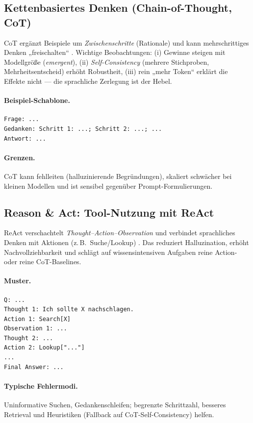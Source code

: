 \subsection{Kettenbasiertes Denken (Chain-of-Thought, CoT)}
CoT ergänzt Beispiele um \emph{Zwischenschritte} (Rationale) und kann mehrschrittiges Denken „freischalten“ \cite{wei2022chain}. 
Wichtige Beobachtungen: (i) Gewinne steigen mit Modellgröße (\emph{emergent}), (ii) \emph{Self-Consistency} (mehrere Stichproben, Mehrheitsentscheid) erhöht Robustheit, (iii) rein „mehr Token“ erklärt die Effekte nicht — die sprachliche Zerlegung ist der Hebel.

\paragraph{Beispiel-Schablone.}
\begin{verbatim}
Frage: ...
Gedanken: Schritt 1: ...; Schritt 2: ...; ...
Antwort: ...
\end{verbatim}

\paragraph{Grenzen.} CoT kann fehlleiten (halluzinierende Begründungen), skaliert schwächer bei kleinen Modellen und ist sensibel gegenüber Prompt-Formulierungen.

\subsection{Reason \& Act: Tool-Nutzung mit ReAct}
ReAct verschachtelt \emph{Thought–Action–Observation} und verbindet sprachliches Denken mit Aktionen (z.\,B.\ Suche/Lookup) \cite{yao2023react}. 
Das reduziert Halluzination, erhöht Nachvollziehbarkeit und schlägt auf wissensintensiven Aufgaben reine Action- oder reine CoT-Baselines.

\paragraph{Muster.}
\begin{verbatim}
Q: ...
Thought 1: Ich sollte X nachschlagen.
Action 1: Search[X]
Observation 1: ...
Thought 2: ...
Action 2: Lookup["..."]
...
Final Answer: ...
\end{verbatim}

\paragraph{Typische Fehlermodi.} Uninformative Suchen, Gedankenschleifen; begrenzte Schrittzahl, besseres Retrieval und Heuristiken (Fallback auf CoT-Self-Consistency) helfen.

